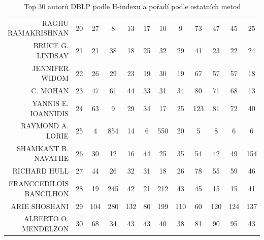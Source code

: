 \documentclass[12pt,titlepage]{report}
\begin{document}
\begin{table}[!ht]
\begin{center}
{\begin{small}
\begin{tabular}{r|ccccccccccc}
RAGHU RAMAKRISHNAN&20&27&8&13&17&10&9&73&47&45&25\\
BRUCE G. LINDSAY&21&21&38&18&25&32&29&41&23&22&24\\
JENNIFER WIDOM&22&26&29&23&19&30&19&67&57&57&18\\
C. MOHAN&23&47&61&44&33&31&34&80&71&68&13\\
YANNIS E. IOANNIDIS&24&63&9&29&34&17&25&123&81&72&40\\
RAYMOND A. LORIE&25&4&854&14&6&550&20&5&8&6&6\\
SHAMKANT B. NAVATHE&26&30&12&16&44&25&35&54&42&49&154\\
RICHARD HULL&27&44&26&32&31&18&26&78&55&59&46\\
FRANCCEDILOIS BANCILHON&28&19&245&42&21&212&43&45&15&15&41\\
ARIE SHOSHANI&29&104&280&132&80&199&110&60&120&124&137\\
ALBERTO O. MENDELZON&30&68&34&43&43&40&38&81&90&95&43\\
\bottomrule
\end{tabular}
\end{small}
}
\end{center}
\caption{Top 30 autorů DBLP podle H-indexu a pořadí podle ostatních metod}
\end{table}
\end{document}
